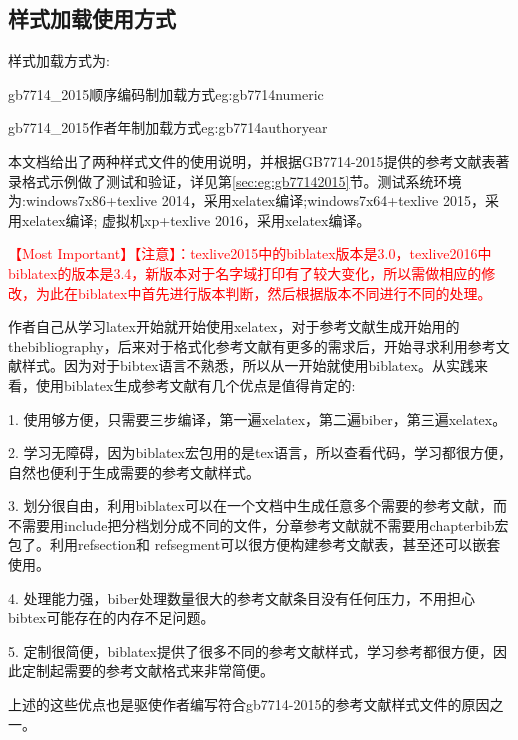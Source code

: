 \documentclass[11pt]{article} %
\begin{document}
\subsection{样式加载使用方式}
样式加载方式为:

\begin{codetex}{gb7714\_2015顺序编码制加载方式}{eg:gb7714numeric}
\usepackage[backend=biber,style=gb7714_2015]{biblatex}
\end{codetex}

\begin{codetex}{gb7714\_2015作者年制加载方式}{eg:gb7714authoryear}
\usepackage[backend=biber,style=gb7714_2015ay]{biblatex}
\end{codetex}

本文档给出了两种样式文件的使用说明，并根据GB7714-2015提供的参考文献表著录格式示例做了测试和验证，详见第\ref{sec:eg:gb77142015}节。测试系统环境为:windows7x86+texlive 2014，采用xelatex编译;windows7x64+texlive 2015，采用xelatex编译; 虚拟机xp+texlive 2016，采用xelatex编译。

\textcolor{red}{\HandRight \heiti 【Most Important】【注意】：texlive2015中的biblatex版本是3.0，texlive2016中biblatex的版本是3.4，新版本对于名字域打印有了较大变化，所以需做相应的修改，为此在biblatex中首先进行版本判断，然后根据版本不同进行不同的处理。}

作者自己从学习latex开始就开始使用xelatex，对于参考文献生成开始用的thebibliography，后来对于格式化参考文献有更多的需求后，开始寻求利用参考文献样式。因为对于bibtex语言不熟悉，所以从一开始就使用biblatex。从实践来看，使用biblatex生成参考文献有几个优点是值得肯定的:

1. 使用够方便，只需要三步编译，第一遍xelatex，第二遍biber，第三遍xelatex。

2. 学习无障碍，因为biblatex宏包用的是tex语言，所以查看代码，学习都很方便，自然也便利于生成需要的参考文献样式。

3. 划分很自由，利用biblatex可以在一个文档中生成任意多个需要的参考文献，而不需要用include把分档划分成不同的文件，分章参考文献就不需要用chapterbib宏包了。利用refsection和 refsegment可以很方便构建参考文献表，甚至还可以嵌套使用。

4. 处理能力强，biber处理数量很大的参考文献条目没有任何压力，不用担心bibtex可能存在的内存不足问题。

5. 定制很简便，biblatex提供了很多不同的参考文献样式，学习参考都很方便，因此定制起需要的参考文献格式来非常简便。

上述的这些优点也是驱使作者编写符合gb7714-2015的参考文献样式文件的原因之一。
\end{document}
